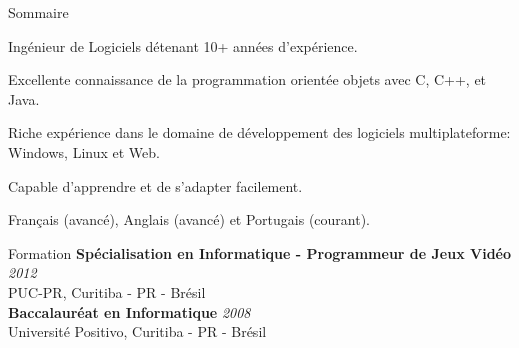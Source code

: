 \documentclass{resume}
\begin{document}
  \begin{rSection}{Sommaire}
     \item Ingénieur de Logiciels détenant 10+ années d’expérience.
     \item Excellente connaissance de la programmation orientée objets avec C, C++, et Java.
     \item Riche expérience dans le domaine de développement des logiciels multiplateforme: Windows, Linux et Web.
     \item Capable d'apprendre et de s'adapter facilement.
     \item Français (avancé), Anglais (avancé) et Portugais (courant).
  \end{rSection}

  \begin{rSection}{Formation}
    {\bf Spécialisation en Informatique - Programmeur de Jeux Vidéo } \hfill {\em 2012} \\
    {PUC-PR, Curitiba - PR - Brésil} \\ 

    {\bf Baccalauréat en Informatique } \hfill {\em 2008} \\
    {Université Positivo, Curitiba - PR - Brésil}   
  \end{rSection}
  
\end{document}
